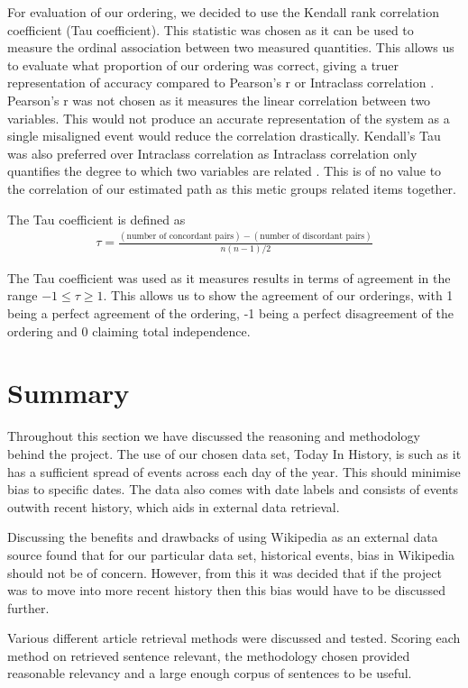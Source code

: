 \documentclass[bsc,frontabs,twoside,singlespacing,parskip,deptreport]{infthesis}     %
\begin{document}
For evaluation of our ordering, we decided to use the Kendall rank correlation coefficient (Tau coefficient).
This statistic was chosen as it can be used to measure the ordinal association between two measured quantities.
This allows us to evaluate what proportion of our ordering was correct, giving a truer representation of accuracy
compared to Pearson's r or Intraclass correlation \cite{}.
Pearson's r was not chosen as it measures the linear correlation between two variables\cite{}.
This would not produce an accurate representation of the system as a single misaligned event would reduce the
correlation drastically.
Kendall's Tau was also preferred over Intraclass correlation as Intraclass correlation only quantifies the
degree to which two variables are related \cite{}. This is of no value to the correlation of our estimated path
as this metic groups related items together.


The Tau coefficient is defined as
\begin{eqnarray}
  \tau=\frac{(\text{number of concordant pairs})-(\text{number of discordant pairs})}{n(n-1)/2}\nonumber
\end{eqnarray}\cite{abdi2007kendall}

The Tau coefficient was used as it measures results in terms of agreement in the range $-1 \leq \tau \geq 1$.
This allows us to show the agreement of our orderings, with 1 being a perfect agreement of the ordering, -1 being a perfect disagreement of the ordering and 0 claiming
total independence.


\section{Summary}
Throughout this section we have discussed the reasoning and methodology behind the project.
The use of our chosen data set, Today In History, is such as it has a sufficient spread of events across
each day of the year. This should minimise bias to specific dates. The data also comes with date labels and
consists of events outwith recent history, which aids in external data retrieval.

Discussing the benefits and drawbacks of using Wikipedia as an external data source found that
for our particular data set, historical events, bias in Wikipedia should not be of concern.
However, from this it was decided that if the project was to move into more recent history then this bias would
have to be discussed further.

Various different article retrieval methods were discussed and tested.
Scoring each method on retrieved sentence relevant, the methodology chosen provided reasonable relevancy
and a large enough corpus of sentences to be useful.
\end{document}
